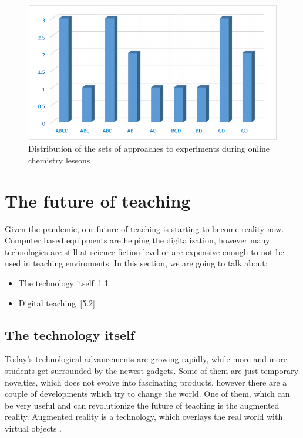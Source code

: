 \documentclass[10pt,oneside,english,a4paper]{article}
\begin{document}
\begin{figure}[tbh!]
\centering
\includegraphics[scale=.55]{coronavirus_2.png}
\caption{Distribution of the sets of approaches to experiments during online chemistry lessons\cite{Babinkov2020}}
\label{f:rozhod}
\end{figure}


\section{The future of teaching}\label{future}

	Given the pandemic, our future of teaching is starting to become reality now. Computer based equipments are helping the digitalization, however many technologies are still at science fiction level or are expensive enough to not be used in teaching enviroments. In this section, we are going to talk about:

\begin{itemize}
\item The technology itself~\ref{5.1}
\item Digital teaching~\ref{5.2}
\end{itemize}

\subsection{The technology itself}\label{5.1}

	Today's technological advancements are growing rapidly, while more and more students get surrounded by the newest gadgets. Some of them are just temporary novelties, which does not evolve into fascinating products, however there are a couple of developments which try to change the world. One of them, which can be very useful and can revolutionize the future of teaching is the augmented reality. Augmented reality is a technology, which overlays the real world with virtual objects \cite{Tretyakova2019}.
\end{document}

